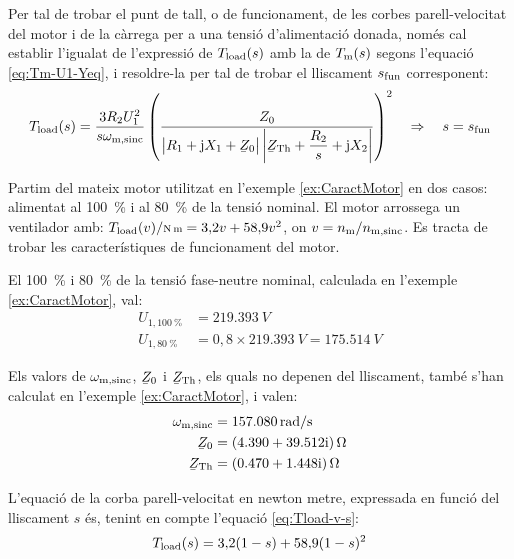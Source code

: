 Per tal de trobar el punt de tall, o de funcionament, de les corbes parell-velocitat del motor i de la càrrega per a una tensió d'alimentació donada, només cal establir l'igualat de l'expressió de $T_\mathrm{load}(s)$ amb la de $T_\mathrm{m}(s)$ segons l'equació \eqref{eq:Tm-U1-Yeq}, i resoldre-la per tal de trobar el lliscament $s_\mathrm{fun}$ corresponent:
\begin{equation}\label{eq:Tload-U1-Yeq}
	T\ped{load}(s) = \frac{3 R_2 U_1^2}{s\omega\ped{m,sinc}}  \left( \frac{Z_0}{\big|R_1 + \ju X_1 + \cmplx{Z}_0\big| \left|\cmplx{Z}\ped{Th} + \dfrac{R_2}{s} + \ju X_2\right|} \right)^2 \quad\Rightarrow \quad s=s\ped{fun}
\end{equation}


\begin{exemple}\label{ex:MotTensRedSolEx}
	\addcontentsxms{\MotTensRedSolEx}
	Partim del mateix motor utilitzat en l'exemple \vref{ex:CaractMotor} en dos casos: alimentat al \qty{100}{\%} i al \qty{80}{\%} de la tensió nominal. El motor arrossega un ventilador amb: $T\ped{load}(v) /{\scriptstyle \unit{N.m}} = 3{,}2 v + 58{,}9 v^2$, on $v = n_\mathrm{m}/n_\mathrm{m,sinc}$. Es tracta de trobar les característiques de funcionament del motor.
	
	El \qty{100}{\%} i \qty{80}{\%} de la tensió fase-neutre nominal, calculada  en l'exemple \ref{ex:CaractMotor}, val:
	\begin{align*}
		U_{1,\qty{100}{\%}} &= \qty{219,393}{V} \\
		U_{1,\qty{80}{\%}} &= 0{,}8\times\qty{219,393}{V} = \qty{175,514}{V}
	\end{align*}

	Els valors de $\omega_\mathrm{m,sinc}$, $\cmplx{Z}_0$ i  $\cmplx{Z}\ped{Th}$, els quals no depenen del lliscament, també s'han calculat en  l'exemple \ref{ex:CaractMotor}, i valen:
	\vspace{-2mm}
	\begin{align*}
		\omega\ped{m,sinc} &=  \qty{157,080}{rad/s} \\
		\cmplx{Z}_0 &=  \complexqty{4,390+j39,512}{\ohm} \\
		\cmplx{Z}\ped{Th} &= \complexqty{0,470+j1,448}{\ohm} 
	\end{align*}
	
	L'equació de la corba parell-velocitat en newton metre, expressada en funció del lliscament $s$ és, tenint en compte l'equació \eqref{eq:Tload-v-s}:
	\[
		T_\mathrm{load}(s) = 3{,}2 (1-s) + 58{,}9 (1-s)^2
	\]


\end{exemple}
